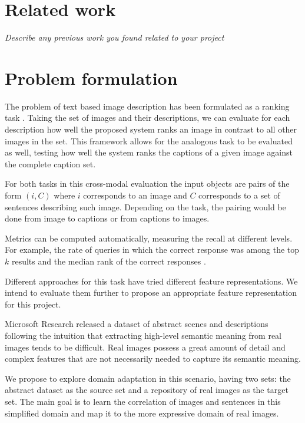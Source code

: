 \documentclass[11pt]{article}
\begin{document}
\section{Related work}
\textit{Describe any previous work you found related to your project}

\section{Problem formulation}

The problem of text based image description has been formulated as a ranking task \cite{Hodosh:2013:FID:2566972.2566993}. Taking the set of images and their descriptions, we can evaluate for each description how well the proposed system ranks an image in contrast to all other images in the set. This framework allows for the analogous task to be evaluated as well, testing how well the system ranks the captions of a given image against the complete caption set. 

For both tasks in this cross-modal evaluation the input objects are pairs of the form $(i, C)$ where $i$ corresponds to an image and $C$ corresponds to a set of sentences describing such image. Depending on the task, the pairing would be done from image to captions or from captions to images. 

Metrics can be computed automatically, measuring the recall at different levels. For example, the rate of queries in which the correct response was among the top $k$ results and the median rank of the correct responses \cite{Hodosh:2013:FID:2566972.2566993}. 

Different approaches for this task have tried different feature representations. We intend to evaluate them further to propose an appropriate feature representation for this project.

Microsoft Research released a dataset of abstract scenes and descriptions following the intuition that
extracting high-level semantic meaning from real images tends to be difficult. Real images possess a great amount of detail and complex features that are not necessarily needed to capture its semantic meaning. 

We propose to explore domain adaptation in this scenario, having two sets: the abstract dataset as the source set and a repository of real images as the target set. The main goal is to learn the correlation of images and sentences in this simplified domain and map it to the more expressive domain of real images. 
\end{document}
